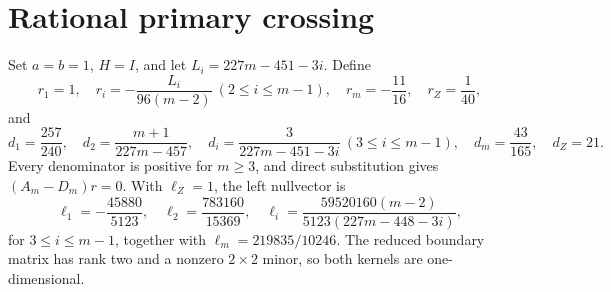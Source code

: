 \section*{Rational primary crossing}
Set $a=b=1$, $H=I$, and let $L_i=227m-451-3i$.  Define
\[
r_1=1,\quad r_i=-\frac{L_i}{96(m-2)}\ (2\le i\le m-1),\quad
r_m=-\frac{11}{16},\quad r_Z=\frac1{40},
\]
and
\[
d_1=\frac{257}{240},\quad d_2=\frac{m+1}{227m-457},\quad
 d_i=\frac3{227m-451-3i}\ (3\le i\le m-1),\quad
 d_m=\frac{43}{165},\quad d_Z=21.
\]
Every denominator is positive for $m\ge3$, and direct substitution gives $(A_m-D_m)r=0$.
With $\ell_Z=1$, the left nullvector is
\[
\ell_1=-\frac{45880}{5123},\quad \ell_2=\frac{783160}{15369},\quad
\ell_i=\frac{59520160(m-2)}{5123(227m-448-3i)},
\]
for $3\le i\le m-1$, together with $\ell_m=219835/10246$.  The reduced boundary matrix has rank two and a nonzero $2\times2$ minor, so both kernels are one-dimensional.

